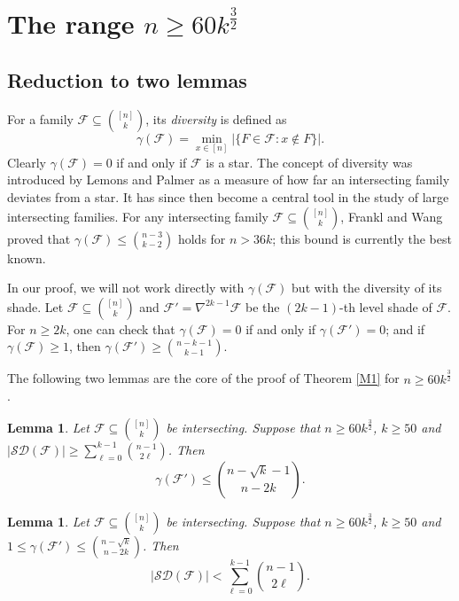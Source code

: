 \documentclass[11pt]{article}
\numberwithin{equation}{section}
\newtheorem{lemma}[theorem]{Lemma}
\begin{document}
    
	\section{The range $n\ge 60k^\frac{3}{2}$}\label{se3}
 
	\subsection{Reduction to two lemmas}

For a family $\mathcal{F} \subseteq \binom{[n]}{k}$, its \textit{diversity} is defined as
$$
\gamma(\mathcal{F}) = \min_{x \in [n]} |\{F \in \mathcal{F} : x \notin F\}|.
$$
Clearly $\gamma(\mathcal{F}) = 0$ if and only if $\mathcal{F}$ is a star. The concept of diversity was introduced by Lemons and Palmer \cite{L08} as a measure of how far an intersecting family deviates from a star. It has since then become a central tool in the study of large intersecting families. For any intersecting family $\mathcal{F} \subseteq \binom{[n]}{k}$,   Frankl and Wang \cite{F24} proved  that $\gamma(\mathcal{F}) \le \binom{n-3}{k-2}$ holds for $n > 36k$; this bound is currently the best known.  

 In our proof, we will not work directly with $\gamma(\mathcal{F})$ but with the diversity of its shade. Let $\mathcal{F}\subseteq\binom{[n]}{k}$ and $\mathcal{F}' = \nabla^{2k-1}\mathcal{F}$ be the $(2k-1)$-th level shade of $\mathcal{F}$. For $n \geq 2k$, one can check that $\gamma(\mathcal{F}) = 0$ if and only if $\gamma(\mathcal{F}') = 0$; and if $\gamma(\mathcal{F}) \ge 1$, then
$
\gamma(\mathcal{F}') \ge \binom{n-k-1}{k-1}.
$

The following two lemmas are the core of the proof of Theorem \ref{M1} for  $n\ge 60k^\frac{3}{2}$.

    
	\begin{lemma}\label{lem1}
		Let $\mathcal{F}\subseteq \binom{[n]}{k}$ be intersecting. Suppose that $n\ge 60k^\frac{3}{2}$, $k\ge 50$ and $|\mathcal{SD}(\mathcal{F})|\geq \sum\limits_{\ell=0}^{k-1}\binom{n-1}{2\ell}$. Then$$\gamma(\mathcal{F}')\le \binom{n-\sqrt{k}-1}{n-2k}.$$
		
	\end{lemma}
	\begin{lemma}\label{lem2}
		Let $\mathcal{F}\subseteq \binom{[n]}{k}$ be intersecting.  Suppose that $n\ge 60k^\frac{3}{2}$, $k\ge 50$ and $1\le \gamma(\mathcal{F}')\le \binom{n-\sqrt{k}}{n-2k}$. Then $$|\mathcal{SD}(\mathcal{F})|< \sum\limits_{\ell=0}^{k-1}\binom{n-1}{2\ell}.$$
	\end{lemma}
	
\end{document}

